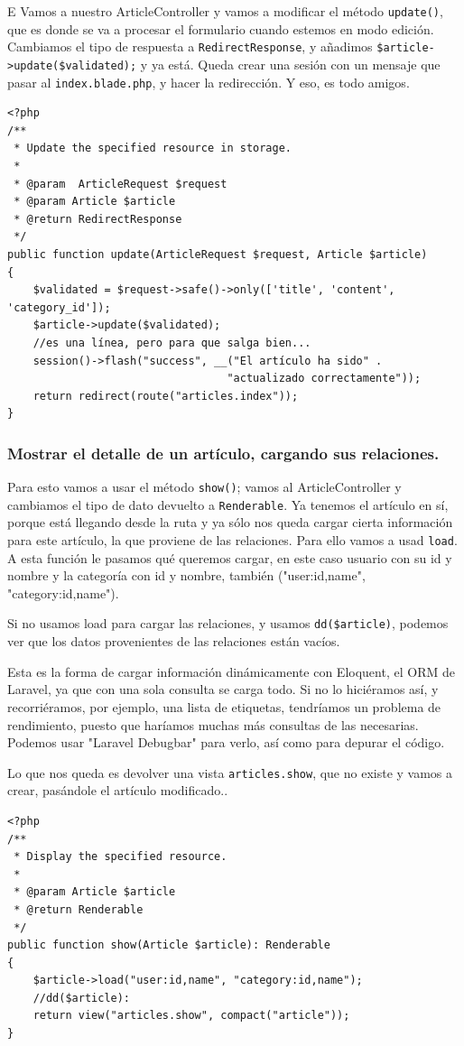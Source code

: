 \documentclass[11pt]{article}
\begin{document}
E Vamos a nuestro ArticleController y vamos a modificar el método
\texttt{update()}, que es donde se va a procesar el formulario cuando estemos
en modo edición. Cambiamos el tipo de respuesta a \texttt{RedirectResponse},
y añadimos \texttt{\$article->update(\$validated);} y ya está. Queda crear una
sesión con un mensaje que pasar al \texttt{index.blade.php}, y hacer la
redirección. Y eso, es todo amigos.
\begin{verbatim}
<?php
/**
 * Update the specified resource in storage.
 *
 * @param  ArticleRequest $request
 * @param Article $article
 * @return RedirectResponse
 */
public function update(ArticleRequest $request, Article $article)
{
    $validated = $request->safe()->only(['title', 'content', 'category_id']);
    $article->update($validated);
    //es una línea, pero para que salga bien...
    session()->flash("success", __("El artículo ha sido" .
                                  "actualizado correctamente"));
    return redirect(route("articles.index"));
}
\end{verbatim}

\subsubsection{Mostrar el detalle de un artículo, cargando sus relaciones.}
\label{sec:org5ddd4e9}
Para esto vamos a usar el método \texttt{show()}; vamos al ArticleController
y cambiamos el tipo de dato devuelto a \texttt{Renderable}. Ya tenemos el
artículo en sí, porque está llegando desde la ruta y ya sólo nos queda
cargar cierta información para este artículo, la que proviene de las
relaciones. Para ello vamos a usad \texttt{load}. A esta función le pasamos
qué queremos cargar, en este caso usuario con su id y nombre y la
categoría con id y nombre, también ("user:id,name", "category:id,name").

Si no usamos load para cargar las relaciones, y usamos \texttt{dd(\$article)},
podemos ver que los datos provenientes de las relaciones están vacíos.

Esta es la forma de cargar información dinámicamente con Eloquent, el
ORM de Laravel, ya que con una sola consulta se carga todo. Si no lo
hiciéramos así, y recorriéramos, por ejemplo, una lista de etiquetas,
tendríamos un problema de rendimiento, puesto que haríamos muchas más
consultas de las necesarias. Podemos usar "Laravel Debugbar" para
verlo, así como para depurar el código.


Lo que nos queda es devolver una vista \texttt{articles.show}, que no existe
y vamos a crear, pasándole el artículo modificado..
\begin{verbatim}
<?php
/**
 * Display the specified resource.
 *
 * @param Article $article
 * @return Renderable
 */
public function show(Article $article): Renderable
{
    $article->load("user:id,name", "category:id,name");
    //dd($article):
    return view("articles.show", compact("article"));
}
\end{verbatim}
\end{document}
